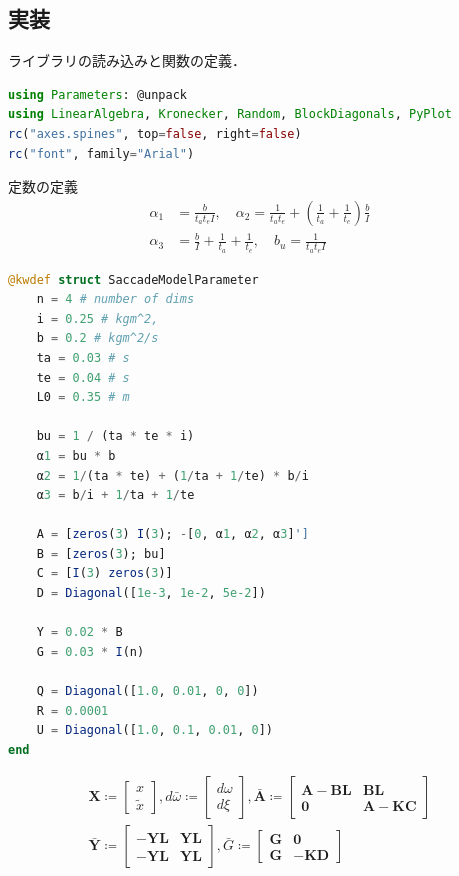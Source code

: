 \subsection{実装}
ライブラリの読み込みと関数の定義．
\begin{lstlisting}[language=julia]
using Parameters: @unpack
using LinearAlgebra, Kronecker, Random, BlockDiagonals, PyPlot
rc("axes.spines", top=false, right=false)
rc("font", family="Arial") 
\end{lstlisting}
定数の定義
\begin{align}
\alpha_{1}&=\frac{b}{t_{a} t_{e} I},\quad \alpha_{2}=\frac{1}{t_{a} t_{e}}+\left(\frac{1}{t_{a}}+\frac{1}{t_{e}}\right) \frac{b}{I} \\
\alpha_{3}&=\frac{b}{I}+\frac{1}{t_{a}}+\frac{1}{t_{e}},\quad b_{u}=\frac{1}{t_{a} t_{e} I}
\end{align}
\begin{lstlisting}[language=julia]
@kwdef struct SaccadeModelParameter
    n = 4 # number of dims
    i = 0.25 # kgm^2, 
    b = 0.2 # kgm^2/s
    ta = 0.03 # s
    te = 0.04 # s
    L0 = 0.35 # m

    bu = 1 / (ta * te * i)
    α1 = bu * b
    α2 = 1/(ta * te) + (1/ta + 1/te) * b/i
    α3 = b/i + 1/ta + 1/te

    A = [zeros(3) I(3); -[0, α1, α2, α3]']
    B = [zeros(3); bu]
    C = [I(3) zeros(3)]
    D = Diagonal([1e-3, 1e-2, 5e-2])

    Y = 0.02 * B
    G = 0.03 * I(n)

    Q = Diagonal([1.0, 0.01, 0, 0]) 
    R = 0.0001
    U = Diagonal([1.0, 0.1, 0.01, 0])
end
\end{lstlisting}
\begin{align}
\mathbf{X}\coloneqq \begin{bmatrix}
x \\
\tilde{x}
\end{bmatrix}, d \bar{\omega} \coloneqq \begin{bmatrix}
d \omega \\
d \xi
\end{bmatrix}, \bar{\mathbf{A}} \coloneqq \begin{bmatrix}
\mathbf{A}-\mathbf{B} \mathbf{L} & \mathbf{B} \mathbf{L} \\
\mathbf{0} & \mathbf{A}-\mathbf{K} \mathbf{C}
\end{bmatrix}\\
\bar{\mathbf{Y}} \coloneqq \begin{bmatrix}
-\mathbf{Y} \mathbf{L} & \mathbf{Y} \mathbf{L} \\
-\mathbf{Y} \mathbf{L} & \mathbf{Y} \mathbf{L}
\end{bmatrix}, \bar{G} \coloneqq \begin{bmatrix}
\mathbf{G} & \mathbf{0} \\
\mathbf{G} & -\mathbf{K} \mathbf{D}
\end{bmatrix}
\end{align}
